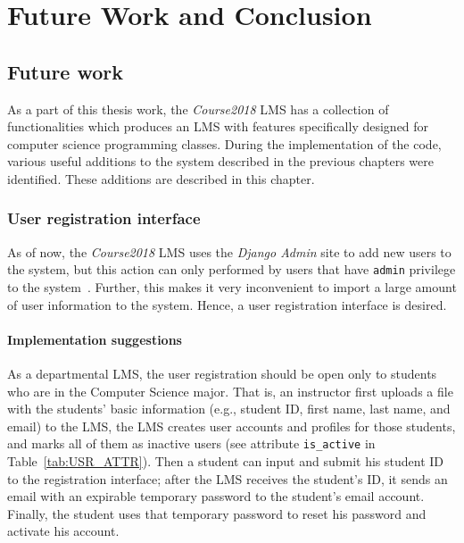 

\chapter{Future Work and Conclusion}
\label{chap:FUTURE}

\section{Future work}
As a part of this thesis work, 
the \emph{Course2018} LMS has a collection of functionalities which produces an
LMS with features specifically designed for computer science programming
classes.
During the implementation of the code, various useful additions to the system
described in the previous chapters were identified.
These additions are described in this chapter.

\subsection{User registration interface}
As of now, the \emph{Course2018} LMS uses the \emph{Django Admin} site to
add new users to the system, but this action can only performed by users that
have \texttt{admin} privilege to the system~\cite{AdjangoAdmin}. Further, this
makes it very inconvenient to import a large amount of user information to the system.
Hence, a user registration interface is desired.

\subsubsection{Implementation suggestions}
As a departmental LMS, the user registration should be open only to students
who are in the Computer Science major.
That is, an instructor first uploads a file with the students' basic information
(e.g., student ID, first name, last name, and email) to the LMS, the LMS
creates user accounts and profiles for those students, and marks all of them
as inactive users (see attribute \texttt{is\_active} in
Table~\ref{tab:USR_ATTR}).
Then a student can input and submit his student ID to the registration
interface; after the LMS receives the student's ID,
it sends an email with an expirable temporary password to the student's
email account.
Finally, the student uses that temporary password to reset his password and
activate his account.

